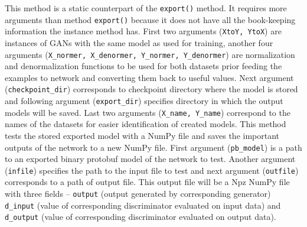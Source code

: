 \begin{itemize}
\begin{description}
 This method is a static counterpart of the \texttt{export()} method. It requires more arguments than method \texttt{export()} because it does not have all the book-keeping information the instance method has. First two arguments (\texttt{XtoY, YtoX}) are instances of GANs with the same model as used for training, another four arguments (\texttt{X\_normer, X\_denormer, Y\_normer, Y\_denormer}) are normalization and denormalization functions to be used for both datasets prior feeding the examples to network and converting them back to useful values. Next argument (\texttt{checkpoint\_dir}) corresponds to checkpoint directory where the model is stored and following argument (\texttt{export\_dir}) specifies directory in which the output models will be saved. Last two arguments (\texttt{X\_name, Y\_name}) correspond to the names of the datasets for easier identification of created models.
 This method tests the stored exported model with a NumPy file and saves the important outputs of the network to a new NumPy file. First argument (\texttt{pb\_model}) is a path to an exported binary protobuf model of the network to test. Another argument (\texttt{infile}) specifies the path to the input file to test and next argument (\texttt{outfile}) corresponds to a path of output file. This output file will be a Npz NumPy file with three fields -- \texttt{output} (output generated by corresponding generator) \texttt{d\_input} (value of corresponding discriminator evaluated on input data) and \texttt{d\_output} (value of corresponding discriminator evaluated on output data).


\end{description}
\end{itemize}

